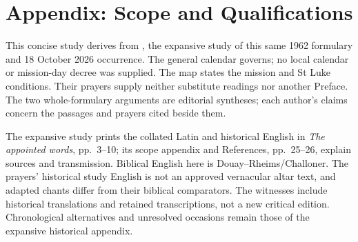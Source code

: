 \section{Appendix: Scope and Qualifications}
This concise study derives from , the expansive study of this same 1962 formulary and 18 October 2026 occurrence. The general calendar governs; no local calendar or mission-day decree was supplied. The map states the mission and St Luke conditions. Their prayers supply neither substitute readings nor another Preface. The two whole-formulary arguments are editorial syntheses; each author's claims concern the passages and prayers cited beside them.

The expansive study prints the collated Latin and historical English in \textit{The appointed words}, pp.~3--10; its scope appendix and References, pp.~25--26, explain sources and transmission. Biblical English here is Douay--Rheims/Challoner. The prayers' historical study English is not an approved vernacular altar text, and adapted chants differ from their biblical comparators. The witnesses include historical translations and retained transcriptions, not a new critical edition. Chronological alternatives and unresolved occasions remain those of the expansive historical appendix.


